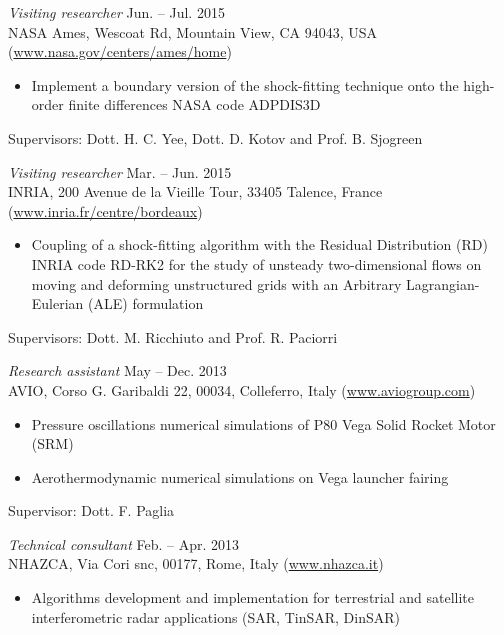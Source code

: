 \documentclass[11pt]{res} %
\begin{document}
\begin{resume}
{\sl Visiting researcher} \hfill  Jun. -- Jul. 2015 \\
NASA Ames, Wescoat Rd, Mountain View, CA 94043, USA (\url{www.nasa.gov/centers/ames/home}) \\
\vspace{-0.4cm}
\begin{itemize} \itemsep -2pt
\item Implement a boundary version of the shock-fitting technique onto the high-order finite differences NASA code ADPDIS3D
\end{itemize}
\vspace{-0.4cm}
Supervisors: Dott. H. C. Yee, Dott. D. Kotov and Prof. B. Sjogreen

{\sl Visiting researcher} \hfill Mar. -- Jun. 2015 \\
INRIA, 200 Avenue de la Vieille Tour, 33405 Talence, France (\url{www.inria.fr/centre/bordeaux}) \\ 
\vspace{-0.4cm}
\begin{itemize} \itemsep -2pt
\item Coupling of a shock-fitting algorithm with the Residual Distribution (RD) INRIA code RD-RK2 for the study of unsteady two-dimensional flows on moving and deforming unstructured grids with an Arbitrary Lagrangian-Eulerian (ALE) formulation
\end{itemize}
\vspace{-0.4cm}
Supervisors: Dott. M. Ricchiuto and Prof. R. Paciorri

\vspace{0.2cm}

{\sl Research assistant} \hfill May -- Dec. 2013 \\
AVIO, Corso G. Garibaldi 22, 00034, Colleferro, Italy (\url{www.aviogroup.com}) \\
\vspace{-0.4cm}
\begin{itemize} \itemsep -2pt
\item Pressure oscillations numerical simulations of P80 Vega Solid Rocket Motor (SRM)
\item Aerothermodynamic numerical simulations on Vega launcher fairing
\end{itemize}
\vspace{-0.4cm}
Supervisor: Dott. F. Paglia

{\sl Technical consultant} \hfill  Feb. -- Apr. 2013 \\
NHAZCA, Via Cori snc, 00177, Rome, Italy (\url{www.nhazca.it}) \\
\vspace{-0.4cm}
\begin{itemize} \itemsep -2pt
\item Algorithms development and implementation for terrestrial and satellite interferometric radar applications (SAR, TinSAR, DinSAR)
\end{itemize}


\end{resume}
\end{document}
